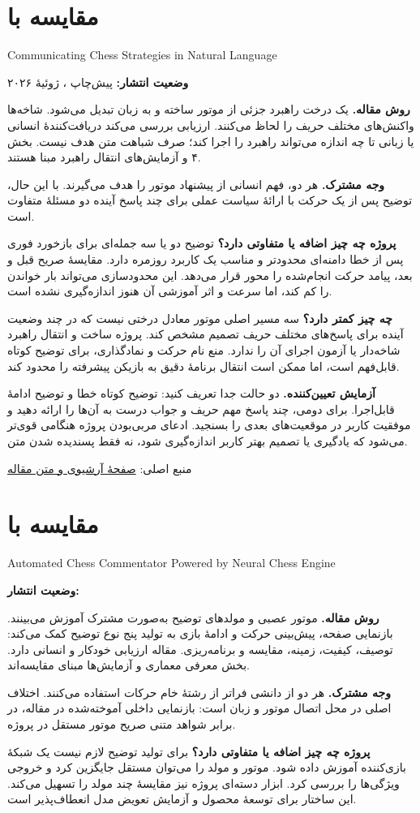 \documentclass[a4paper,12pt]{article}
\newcommand{\en}[1]{\lr{#1}}
\newcommand{\source}[2]{\par\small منبع اصلی: \href{#1}{#2}\par\normalsize}
\newcommand{\paper}[3]{\clearpage\section{#1}\begin{latin}\small #2\end{latin}\textbf{وضعیت انتشار:} #3\par}
\begin{document}
\paper{مقایسه با \en{Cui et al.}}{Communicating Chess Strategies in Natural Language}{پیش‌چاپ \en{arXiv}، ژوئیهٔ ۲۰۲۶}
\textbf{روش مقاله.} یک درخت راهبرد جزئی از موتور ساخته و به زبان تبدیل می‌شود. شاخه‌ها واکنش‌های مختلف حریف را لحاظ می‌کنند. ارزیابی بررسی می‌کند دریافت‌کنندهٔ انسانی یا زبانی تا چه اندازه می‌تواند راهبرد را اجرا کند؛ صرف شباهت متن هدف نیست. بخش ۴ و آزمایش‌های انتقال راهبرد مبنا هستند.

\textbf{وجه مشترک.} هر دو، فهم انسانی از پیشنهاد موتور را هدف می‌گیرند. با این حال، توضیح پس از یک حرکت با ارائهٔ سیاست عملی برای چند پاسخ آینده دو مسئلهٔ متفاوت است.

\textbf{پروژه چه چیز اضافه یا متفاوتی دارد؟} توضیح دو یا سه جمله‌ای برای بازخورد فوری پس از خطا دامنه‌ای محدودتر و مناسب یک کاربرد روزمره دارد. مقایسهٔ صریح قبل و بعد، پیامد حرکت انجام‌شده را محور قرار می‌دهد. این محدودسازی می‌تواند بار خواندن را کم کند، اما سرعت و اثر آموزشی آن هنوز اندازه‌گیری نشده است.

\textbf{چه چیز کمتر دارد؟} سه مسیر اصلی موتور معادل درختی نیست که در چند وضعیت آینده برای پاسخ‌های مختلف حریف تصمیم مشخص کند. پروژه ساخت و انتقال راهبرد شاخه‌دار یا آزمون اجرای آن را ندارد. منع نام حرکت و نمادگذاری، برای توضیح کوتاه قابل‌فهم است، اما ممکن است انتقال برنامهٔ دقیق به بازیکن پیشرفته را محدود کند.

\textbf{آزمایش تعیین‌کننده.} دو حالت جدا تعریف کنید: توضیح کوتاه خطا و توضیح ادامهٔ قابل‌اجرا. برای دومی، چند پاسخ مهم حریف و جواب درست به آن‌ها را ارائه دهید و موفقیت کاربر در موقعیت‌های بعدی را بسنجید. ادعای مربی‌بودن پروژه هنگامی قوی‌تر می‌شود که یادگیری یا تصمیم بهتر کاربر اندازه‌گیری شود، نه فقط پسندیده شدن متن.
\source{https://arxiv.org/abs/2607.11486}{صفحهٔ آرشیوی و متن مقاله}

\paper{مقایسه با \en{Zang et al.}}{Automated Chess Commentator Powered by Neural Chess Engine}{\en{ACL 2019}}
\textbf{روش مقاله.} موتور عصبی و مولدهای توضیح به‌صورت مشترک آموزش می‌بینند. بازنمایی صفحه، پیش‌بینی حرکت و ادامهٔ بازی به تولید پنج نوع توضیح کمک می‌کند: توصیف، کیفیت، زمینه، مقایسه و برنامه‌ریزی. مقاله ارزیابی خودکار و انسانی دارد. بخش معرفی معماری و آزمایش‌ها مبنای مقایسه‌اند.

\textbf{وجه مشترک.} هر دو از دانشی فراتر از رشتهٔ خام حرکات استفاده می‌کنند. اختلاف اصلی در محل اتصال موتور و زبان است: بازنمایی داخلی آموخته‌شده در مقاله، در برابر شواهد متنی صریح موتور مستقل در پروژه.

\textbf{پروژه چه چیز اضافه یا متفاوتی دارد؟} برای تولید توضیح لازم نیست یک شبکهٔ بازی‌کننده آموزش داده شود. موتور و مولد را می‌توان مستقل جایگزین کرد و خروجی ویژگی‌ها را بررسی کرد. ابزار دسته‌ای پروژه نیز مقایسهٔ چند مولد را تسهیل می‌کند. این ساختار برای توسعهٔ محصول و آزمایش تعویض مدل انعطاف‌پذیر است.
\end{document}
